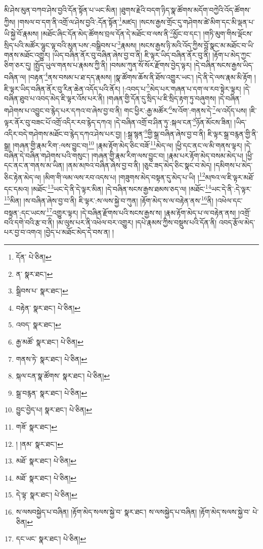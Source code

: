 མི་ཤེས་མུན་བཀབ་ཤེས་བྱའི་དོན་སྟོན་པ་ཡང་མིན། །ཐུགས་རྗེའི་བདག་ཉིད་སྣ་ཚོགས་མདོག་བཀྱེའི་འོད་ཚོགས་ཀྱིས། །གསལ་བ་དག་ནི་འགྲོ་ལ་ཤེས་བྱའི་:དོན་སྟོན་\footnote{དོན་  པེ་ཅིན། }མཛད། །སངས་རྒྱས་གྲོང་དུ་གཤེགས་ཚེ་མིག་དང་མི་ལྡན་པ་ཡི་སྐྱེ་བོ་རྣམས། །མཐོང་ཞིང་དོན་མེད་ཚོགས་བྲལ་དོན་དེ་མཐོང་བ་ལས་ནི་\footnote{ན་  སྣར་ཐང་། }མྱོང་བ་དང་། །གཏི་མུག་གིས་ལྡོངས་སྲིད་པའི་མཚོར་ལྷུང་ལྟ་བའི་མུན་པས་:བསྒྲིབས་པ་\footnote{སྒྲིབས་པ་  སྣར་ཐང་། }རྣམས། །སངས་རྒྱས་ཉི་མའི་འོད་ཀྱིས་བློ་སྣང་མ་མཐོང་བ་ཡི་གནས་མཐོང་འགྱུར། །ཡིད་བཞིན་ནོར་བུ་བཞིན་ཞེས་བྱ་བ་ནི། ཇི་ལྟར་ཡིད་བཞིན་ནོར་བུ་ནི། །རྟོག་པ་མེད་ཀྱང་ཅིག་ཅར་དུ། །སྤྱོད་ཡུལ་གནས་པ་རྣམས་ཀྱི་ནི། །བསམ་ཀུན་སོ་སོར་རྫོགས་བྱེད་ལྟར། །དེ་བཞིན་སངས་རྒྱས་ཡིད་བཞིན་ལ། །བརྟན་\footnote{བརྟེན་  སྣར་ཐང་།  པེ་ཅིན། }ནས་བསམ་པ་ཐ་དད་རྣམས། །སྣ་ཚོགས་ཆོས་ནི་ཐོས་འགྱུར་ཡང་། །དེ་ནི་དེ་ལས་རྣམ་མི་རྟོག །ཇི་ལྟར་ཡིད་བཞིན་ནོར་བུ་རིན་ཆེན་འདོད་པའི་ནོར། །:འབད་པ་\footnote{འབད་  སྣར་ཐང་། }མེད་པར་གཞན་པ་དག་ལ་རབ་སྟེར་ལྟར། །དེ་བཞིན་ཐུབ་པ་འབད་མེད་ཇི་ལྟར་འོས་པར་ནི། །གཞན་གྱི་དོན་དུ་སྲིད་པ་ཇི་སྲིད་རྟག་ཏུ་བཞུགས། །དེ་བཞིན་གཤེགས་པ་འབྱུང་བ་རྙེད་པར་དཀའ་བ་ཞེས་བྱ་བ་ནི། གང་ཕྱིར་:རྒྱ་མཚོར་\footnote{རྒྱ་མཚོ་  སྣར་ཐང་།  པེ་ཅིན། }ས་འོག་:གནས་དེ་\footnote{གནས་ཏེ་  སྣར་ཐང་།  པེ་ཅིན། }ལ་འདོད་པས། །ཇི་ལྟར་ནོར་བུ་བཟང་པོ་འགྲོ་འདིར་རབ་རྙེད་དཀའ། །དེ་བཞིན་འགྲོ་བ་ཤིན་ཏུ་:སྐལ་ངན་\footnote{སྐལ་ངན་སྣ་ཚོགས་  སྣར་ཐང་།  པེ་ཅིན། }ཉོན་མོངས་ཟིན། །ཡིད་འདིར་བདེ་གཤེགས་མཐོང་བ་རྙེད་དཀའ་ཤེས་པར་བྱ། །:སྒྲ་སྙན་\footnote{སྒྲ་བརྙན་  སྣར་ཐང་།  པེ་ཅིན། }གྱི་སྒྲ་བཞིན་ཞེས་བྱ་བ་ནི། ཇི་ལྟར་སྒྲ་བརྙན་གྱི་ནི་སྒྲ། །གཞན་གྱི་རྣམ་རིག་:ལས་བྱུང་བ།\footnote{བྱུང་བྱེད་པ།  སྣར་ཐང་།  པེ་ཅིན། } །རྣམ་རྟོག་མེད་ཅིང་བཟོ་\footnote{གཟོ་  སྣར་ཐང་། }མེད་ལ། །ཕྱི་དང་ནང་ལ་མི་གནས་ལྟར། །དེ་བཞིན་དེ་བཞིན་གཤེགས་པའི་གསུང་། །གཞན་གྱི་རྣམ་རིག་ལས་བྱུང་བ། །རྣམ་པར་རྟོག་མེད་བསམ་མེད་པ། །ཕྱི་དང་ནང་ན་གནས་མ་ཡིན། །ནམ་མཁའ་བཞིན་ཞེས་བྱ་བ་ནི། །ཅུང་ཟད་མེད་ཅིང་སྣང་བ་མེད། །དམིགས་པ་མེད་ཅིང་རྟེན་མེད་ལ། །མིག་གི་ལམ་ལས་རབ་འདས་པ། །གཟུགས་མེད་བསྟན་དུ་མེད་པ་ཡི། །\footnote{། །ནམ་  སྣར་ཐང་། }མཁའ་ལ་ཇི་ལྟར་མཐོ་དང་དམའ། །མཐོང་\footnote{མཐོ་  སྣར་ཐང་།  པེ་ཅིན། }ཡང་དེ་ནི་དེ་ལྟར་མིན། །དེ་བཞིན་སངས་རྒྱས་ཐམས་ཅད་ལ། །མཐོང་\footnote{མཐོ་  སྣར་ཐང་།  པེ་ཅིན། }ཡང་དེ་ནི་:དེ་ལྟར་\footnote{དེ་ལྟ་  སྣར་ཐང་།  པེ་ཅིན། }མིན། །ས་བཞིན་ཞེས་བྱ་བ་ནི། ཇི་ལྟར་:ས་ལས་སྐྱེ་བ་ཀུན། །རྟོག་མེད་ས་ལ་བརྟེན་ནས་\footnote{ས་ལསབསྐྱེད་པ་བཞིན། །རྟོག་མེད་སལས་སྐྱེ་བ་  སྣར་ཐང་། ས་ལསསྐྱེད་པ་བཞིན། །རྟོག་མེད་སལས་སྐྱེ་བ་  པེ་ཅིན། }ནི། །འཕེལ་དང་བསྟན་:དང་ཡངས་\footnote{དང་ཡང་  སྣར་ཐང་།  པེ་ཅིན། }འགྱུར་ལྟར། །དེ་བཞིན་རྫོགས་པའི་སངས་རྒྱས་ས། །རྣམ་རྟོག་མེད་པ་ལ་བརྟེན་ནས། །འགྲོ་བའི་དགེ་བའི་རྩ་བ་ནི། །མ་ལུས་པར་ནི་འཕེལ་བར་འགྱུར། །དཔེ་རྣམས་ཀྱིས་བསྡུས་པའི་དོན་ནི། འབད་རྩོལ་མེད་པར་བྱ་བ་འགའ། །བྱེད་པ་མཐོང་མེད་དེ་བས་ན། །
